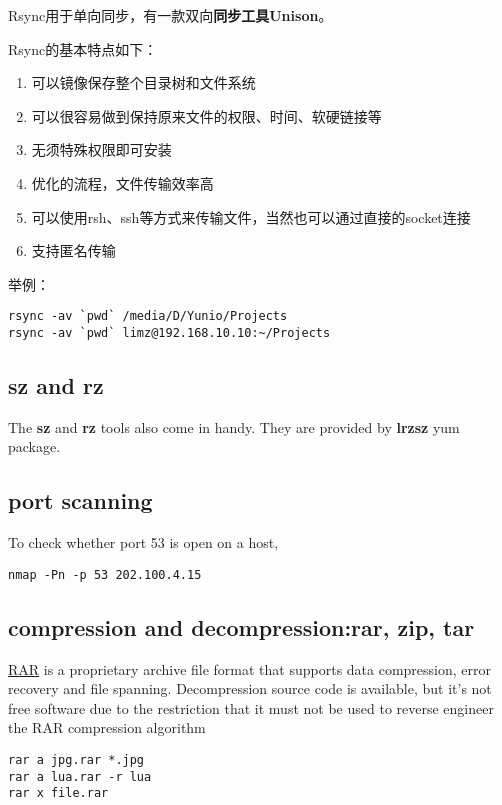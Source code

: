 Rsync用于单向同步，有一款双向\textbf{同步工具Unison}。

Rsync的基本特点如下：
\begin{enumerate}
\item 可以镜像保存整个目录树和文件系统
\item 可以很容易做到保持原来文件的权限、时间、软硬链接等
\item 无须特殊权限即可安装
\item 优化的流程，文件传输效率高
\item 可以使用rsh、ssh等方式来传输文件，当然也可以通过直接的socket连接
\item 支持匿名传输
\end{enumerate}

举例：
\begin{verbatim}
rsync -av `pwd` /media/D/Yunio/Projects
rsync -av `pwd` limz@192.168.10.10:~/Projects
\end{verbatim}

\subsection{sz and rz}

The \textbf{sz} and \textbf{rz} tools also come in handy. 
They are provided by \textbf{lrzsz} yum package.

\subsection{port scanning}
To check whether port 53 is open on a host,
\begin{verbatim}
nmap -Pn -p 53 202.100.4.15
\end{verbatim}


\subsection{compression and decompression:rar, zip, tar}

\href{https://en.wikipedia.org/wiki/RAR_(file_format)}{RAR} is a proprietary
archive file format that supports data compression, error recovery and file spanning.
Decompression source code is available, but it's not free software due to the
restriction that it must not be used to reverse engineer the RAR compression algorithm

\begin{verbatim}
rar a jpg.rar *.jpg 
rar a lua.rar -r lua
rar x file.rar 
\end{verbatim}

